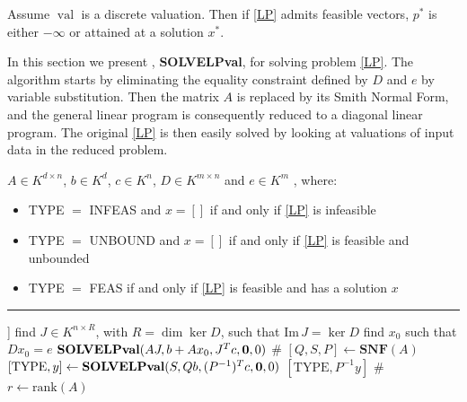 \documentclass{elsarticle}
\theoremstyle{plain}
\theoremstyle{definition}
\DeclareMathOperator{\val}{val}
\begin{document}
\begin{remark}
  Assume $\val$ is a discrete valuation. Then
  if \eqref{LP} admits feasible vectors,
  $p^*$ is either $-\infty$ or attained at a solution $x^*$.
\end{remark}

In this section we present , \textbf{SOLVELPval}, for solving problem \eqref{LP}.
The algorithm starts by eliminating the equality constraint defined by $D$ and $e$
by variable substitution. Then the matrix $A$ is replaced by its Smith Normal Form,
and the general linear program is consequently reduced to a diagonal linear program.
The original \eqref{LP} is then easily solved by looking at valuations of input data
in the reduced problem.

\begin{algorithm}[!ht]
    \caption{\textbf{SOLVELPval}($A,b,c,D,e$)}\label{algo_LP}
    \begin{algorithmic}[1]
      \REQUIRE
      $A \in K^{d\times n}$, $b \in K^d$, $c \in K^n$, $D \in K^{m \times n}$ and $e \in K^m$
      \ENSURE [TYPE, $x$], where:
      \begin{itemize}
      \item[]
        TYPE $=$ INFEAS and $x=[]$ if and only if \eqref{LP} is infeasible
      \item[]
        TYPE $=$ UNBOUND and $x=[]$ if and only if \eqref{LP} is feasible and unbounded
      \item[]
        TYPE $=$ FEAS if and only if \eqref{LP} is feasible and has a solution $x$
      \end{itemize}
      \hrule
      \vspace{0.1cm}
      \RETURN [INFEAS, []] \label{step:linear_empty}
      \ENDIF
       \label{step:reducD:begin}
      \STATE find $J \in K^{n \times R}$, with $R = \dim\ker D$, such that $\text{Im}\, J = \ker D$
      \STATE find $x_0$ such that $Dx_0=e$ \label{step:reducD:end}
      \RETURN $\textbf{SOLVELPval}(AJ,b+A x_0,J^T c, {\bf 0},0)$ \label{step:reducD} \hfill {\color{olive} \# }
      \ENDIF
       \label{step:solsLP:begin}
      \STATE $[Q,S,P] \leftarrow \textbf{SNF}(A)$
      \STATE $[\mathrm{TYPE}, y] \leftarrow \textbf{SOLVELPval}(S,Qb,(P^{-1})^Tc,{\bf 0},0)$ \label{step:solsLP:end}
      \RETURN $[\mathrm{TYPE}, P^{-1}y]$ \hfill \color{olive} \#  \label{step:solsLP}
      \ENDIF
      \STATE $r \leftarrow \text{rank}(A)$

\end{algorithmic}
\end{algorithm}
\end{document}
